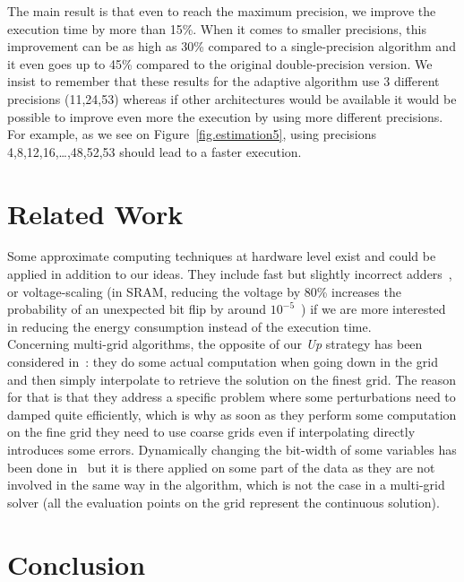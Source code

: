 \documentclass[10pt,conference]{IEEEtran}
\begin{document}
   The main result is that even to reach the maximum precision, we improve the execution time by more than 15\%. When it comes to smaller precisions, this improvement can be as high as 30\% compared to
   a single-precision algorithm and it even goes up to 45\% compared to the original double-precision version. We insist to remember that these results for the adaptive algorithm use 3 different precisions (11,24,53)
   whereas if other architectures would be available it would be possible to improve even more the execution by using more different precisions. For example, as we see on Figure~\ref{fig.estimation5}, using precisions
   4,8,12,16,\dots,48,52,53 should lead to a faster execution.
   
   \section{Related Work}
   
   Some approximate computing techniques at hardware level exist and could be applied in addition to our ideas. They include fast but slightly incorrect adders~\cite{Gupta:2011}, or voltage-scaling (in SRAM, reducing
   the voltage by 80\% increases the probability of an unexpected bit flip by around $10^{-5}$~\cite{Sampson:2011})
   if we are more interested in reducing the energy consumption instead of the execution time.\\
   Concerning multi-grid algorithms, the opposite of our \emph{Up} strategy has been considered in~\cite{JAMESON}: they do some actual computation when going down in the grid and then simply interpolate to retrieve the solution on the finest grid. The reason for that is that they
   address a specific problem where some perturbations need to damped quite efficiently, which is why as soon as they perform some computation on the fine grid they need to use coarse grids even if interpolating directly introduces some errors.
   Dynamically changing the bit-width of some variables has been done in~\cite{Park:2010} but it is there applied on some part of the data as they are not involved in the same way in the algorithm,
   which is not the case in a multi-grid solver (all the evaluation points on the grid represent the continuous solution).
   
   \section{Conclusion}
   
\end{document}
